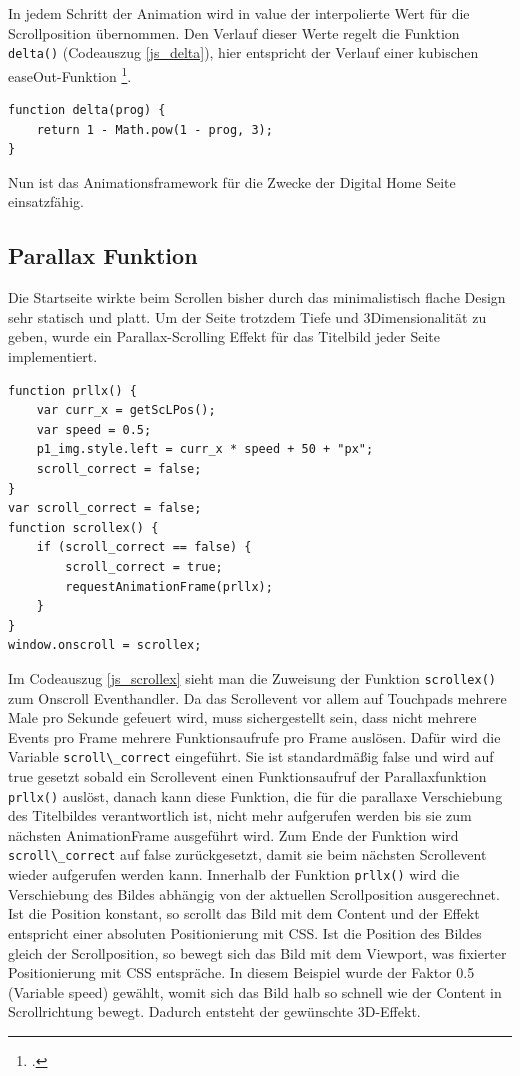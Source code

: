 In jedem Schritt der Animation wird in value der interpolierte Wert für die Scrollposition übernommen. Den Verlauf dieser Werte regelt die Funktion \lstinline{delta()} (Codeauszug \ref{js_delta}), hier entspricht der Verlauf einer kubischen easeOut-Funktion \footcite[vgl.][]{easeOut}.



\begin{lstlisting}[caption=Die Funktion delta., label=js_delta]
function delta(prog) {
	return 1 - Math.pow(1 - prog, 3);
}
\end{lstlisting}

Nun ist das Animationsframework für die Zwecke der Digital Home Seite einsatzfähig.

\subsection{Parallax Funktion}
Die Startseite wirkte beim Scrollen bisher durch das minimalistisch flache Design sehr statisch und platt. Um der Seite trotzdem Tiefe und 3Dimensionalität zu geben, wurde ein Parallax-Scrolling Effekt für das Titelbild jeder Seite implementiert.

\begin{lstlisting}[caption=Das Onscroll Event und die Parallax Callbackfunktion., label=js_scrollex]
function prllx() {
	var curr_x = getScLPos();
	var speed = 0.5;
	p1_img.style.left = curr_x * speed + 50 + "px";
	scroll_correct = false;
}
var scroll_correct = false;
function scrollex() {
	if (scroll_correct == false) {
		scroll_correct = true;
		requestAnimationFrame(prllx);
	}
}
window.onscroll = scrollex;
\end{lstlisting}

Im Codeauszug \ref{js_scrollex} sieht man die Zuweisung der Funktion \lstinline{scrollex()} zum Onscroll Eventhandler. Da das Scrollevent vor allem auf Touchpads mehrere Male pro Sekunde gefeuert wird, muss sichergestellt sein, dass nicht mehrere Events pro Frame mehrere Funktionsaufrufe pro Frame auslösen. Dafür wird die Variable \lstinline{scroll\_correct} eingeführt. Sie ist standardmäßig false und wird auf true gesetzt sobald ein Scrollevent einen Funktionsaufruf der Parallaxfunktion \lstinline{prllx()} auslöst, danach kann diese Funktion, die für die parallaxe Verschiebung des Titelbildes verantwortlich ist, nicht mehr aufgerufen werden bis sie zum nächsten AnimationFrame ausgeführt wird. Zum Ende der Funktion wird \lstinline{scroll\_correct} auf false zurückgesetzt, damit sie beim nächsten Scrollevent wieder aufgerufen werden kann. Innerhalb der Funktion \lstinline{prllx()} wird die Verschiebung des Bildes abhängig von der aktuellen Scrollposition ausgerechnet. Ist die Position konstant, so scrollt das Bild mit dem Content und der Effekt entspricht einer absoluten Positionierung mit CSS. Ist die Position des Bildes gleich der Scrollposition, so bewegt sich das Bild mit dem Viewport, was fixierter Positionierung mit CSS entspräche. In diesem Beispiel wurde der Faktor 0.5 (Variable speed) gewählt, womit sich das Bild halb so schnell wie der Content in Scrollrichtung bewegt. Dadurch entsteht der gewünschte 3D-Effekt.




